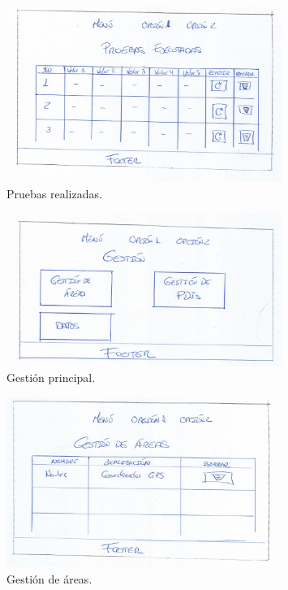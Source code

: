 \begin{figure}[!htbp]
  \centering
    \includegraphics[width=0.8\textwidth]{../img/prototipado/baja/pruebas.png}
  \caption{Pruebas realizadas.}
  \label{pruebas}
\end{figure}

\begin{figure}[!htbp]
  \centering
    \includegraphics[width=0.8\textwidth]{../img/prototipado/baja/gestion.png}
  \caption{Gestión principal.}
  \label{gestion}
\end{figure}

\begin{figure}[!htbp]
  \centering
    \includegraphics[width=0.8\textwidth]{../img/prototipado/baja/areas.png}
  \caption{Gestión de áreas.}
  \label{areas}
\end{figure}

